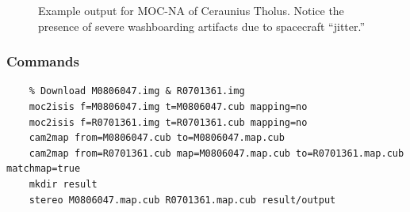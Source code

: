 \begin{figure}[h!]
\centering
  \hfil
\caption{Example output for MOC-NA of Ceraunius Tholus. Notice the presence of severe washboarding artifacts due to spacecraft ``jitter.''}
\label{fig:mocna_ceraunius_example}
\end{figure}

\subsubsection*{Commands}

\begin{verbatim}
    % Download M0806047.img & R0701361.img
    moc2isis f=M0806047.img t=M0806047.cub mapping=no
    moc2isis f=R0701361.img t=R0701361.cub mapping=no
    cam2map from=M0806047.cub to=M0806047.map.cub
    cam2map from=R0701361.cub map=M0806047.map.cub to=R0701361.map.cub matchmap=true
    mkdir result
    stereo M0806047.map.cub R0701361.map.cub result/output
\end{verbatim}

